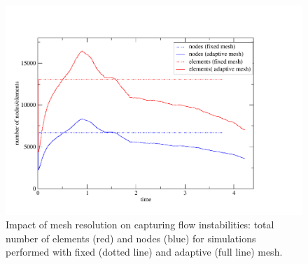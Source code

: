\begin{figure}[ht] 
\includegraphics[width=\textwidth]{./Pics1/Section4_4/Five_regions_adapt_PlotTimeNodesElements.pdf}
\caption{Impact of mesh resolution on capturing flow instabilities: total number of elements (red) and nodes (blue) for simulations performed with fixed (dotted line) and adaptive (full line) mesh. }
\label{fig:5regions_plottimenodeselements}
\end{figure}



